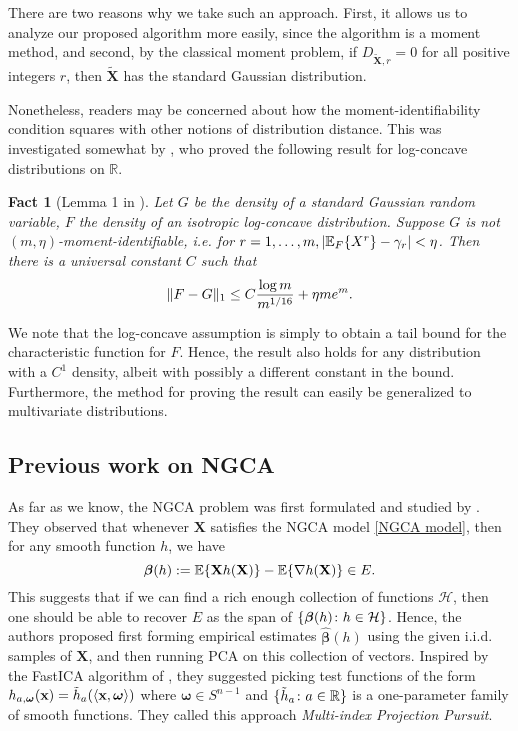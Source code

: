 \documentclass[final,12pt]{colt2018} %
\numberwithin{equation}{section}
\newtheorem{fact}[theorem]{Fact}
\DeclarePairedDelimiter{\abs}{\lvert}{\rvert}
\DeclarePairedDelimiter{\norm}{\lVert}{\rVert}
\DeclarePairedDelimiter{\braces}{\lbrace}{\rbrace}
\DeclarePairedDelimiter{\inprod}{\langle}{\rangle}
\newcommand{\E}{\mathbb{E}}
\newcommand{\R}{\mathbb{R}}
\newcommand{\boldx}{\textbf{x}}
\newcommand{\boldomega}{\boldsymbol{\omega}}
\newcommand{\boldX}{\textbf{X}}
\newcommand{\del}{\nabla}
\begin{document}
There are two reasons why we take such an approach. First, it allows us to analyze our proposed algorithm more easily, since the algorithm is a moment method, and second, by the classical moment problem, if $D_{\tilde{\boldX},r}=0$ for all positive integers $r$, then $\tilde{\boldX}$ has the standard Gaussian distribution.

Nonetheless, readers may be concerned about how the moment-identifiability condition squares with other notions of distribution distance. This was investigated somewhat by \cite{Vempala2011}, who proved the following result for log-concave distributions on $\R$.

\begin{fact}[Lemma 1 in \cite{Vempala2011}]
	Let $G$ be the density of a standard Gaussian random variable, $F$ the density of an isotropic log-concave distribution. Suppose $G$ is not $(m,\eta)$-moment-identifiable, i.e. for $r=1,\ldots,m, \abs{\E_F\braces{X^r} - \gamma_r} < \eta$. Then there is a universal constant $C$ such that
	\begin{equation*}
	\norm{F-G}_1 \leq C\frac{\log m}{m^{1/16}} + \eta me^m.
	\end{equation*}
\end{fact}

We note that the log-concave assumption is simply to obtain a tail bound for the characteristic function for $F$. Hence, the result also holds for any distribution with a $C^1$ density, albeit with possibly a different constant in the bound. Furthermore, the method for proving the result can easily be generalized to multivariate distributions.

\subsection{Previous work on NGCA} 

As far as we know, the NGCA problem was first formulated and studied by \cite{Blanchard2006b}. They observed that whenever $\boldX$ satisfies the NGCA model \eqref{NGCA model}, then for any smooth function $h$, we have
\begin{equation} \label{eq:Stein_identity}
\boldsymbol{\beta}(h) := \E\braces{\boldX h(\boldX)} - \E\braces{\del h(\boldX)} \in E.
\end{equation}
This suggests that if we can find a rich enough collection of functions $\mathcal{H}$, then one should be able to recover $E$ as the span of $\braces{ \boldsymbol{\beta}(h) \colon h \in \mathcal{H}}$. Hence, the authors proposed first forming empirical estimates $\hat{\boldsymbol{\beta}}(h)$ using the given i.i.d. samples of $\boldX$, and then running PCA on this collection of vectors. Inspired by the FastICA algorithm of \cite{Hyvarinen1997}, they suggested picking test functions of the form $h_{a,\boldomega}(\boldx) = \tilde{h}_a(\inprod{\boldx,\boldomega})$ where $\boldomega \in S^{n-1}$ and $\braces{\tilde{h}_a \colon a \in \R}$ is a one-parameter family of smooth functions. They called this approach \emph{Multi-index Projection Pursuit}.
\end{document}
